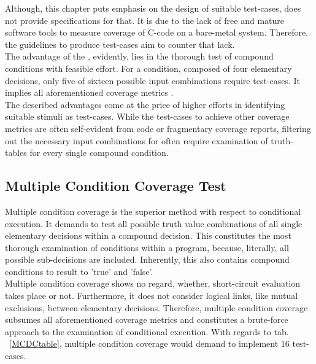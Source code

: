 	Although, this chapter puts emphasis on the design of suitable test-cases, \mcdc does not provide specifications for that. It is due to the lack of free and mature software tools to measure \mcdc coverage of C-code on a bare-metal system. Therefore, the guidelines to produce test-cases aim to counter that lack. \\

	The advantage of the \mcdc, evidently, lies in the thorough test of compound conditions with feasible effort. For a condition, composed of four elementary decisions, only five of sixteen possible input combinations require test-cases. It implies all aforementioned coverage metrics \cite{Hayhurst2001APT}. \\
	
	The described advantages come at the price of higher efforts in identifying suitable stimuli as test-cases. While the test-cases to achieve other coverage metrics are often self-evident from code or fragmentary coverage reports, filtering out the necessary input combinations for \mcdc often require examination of truth-tables for every single compound condition.
	
	\subsection{Multiple Condition Coverage Test}
	Multiple condition coverage is the superior method with respect to conditional execution. It demands to test all possible truth value combinations of all single elementary decisions within a compound decision. This constitutes the most thorough examination of conditions within a program, because, literally, all possible sub-decisions are included. Inherently, this also contains compound conditions to result to 'true' and 'false'. \\
	
	Multiple condition coverage shows no regard, whether, short-circuit evaluation takes place or not. Furthermore, it does not consider logical links, like mutual exclusions, between elementary decisions. Therefore, multiple condition coverage subsumes all aforementioned coverage metrics and constitutes a brute-force approach to the examination of conditional execution. With regards to tab. ~\ref{MCDCtable}, multiple condition coverage would demand to implement 16 test-cases. \\
	
